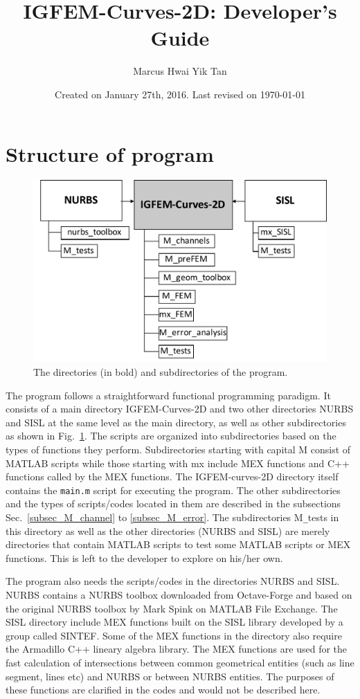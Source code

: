 \documentclass[11pt,letterpaper]{article}
\title{IGFEM-Curves-2D: Developer's Guide}
\author{Marcus Hwai Yik Tan}
\date{Created on January 27th, 2016. Last revised on \today}
\begin{document}
\maketitle
\section{Structure of program}
\begin{figure}[!h]
\centering
\includegraphics[width=\linewidth]{CodeStructure.pdf}
\caption{The directories (in bold) and subdirectories of the program. \label{fig_code_structure}}
\end{figure}
The program follows a straightforward functional programming paradigm. It consists of a main directory IGFEM-Curves-2D and two other directories NURBS and SISL at the same level as the main directory, as well as other subdirectories as shown in Fig.\ \ref{fig_code_structure}. The scripts are organized into subdirectories based on the types of functions they perform. Subdirectories starting with capital M  consist of MATLAB scripts while those starting with mx include MEX functions and C++ functions called by the MEX functions. The IGFEM-curves-2D directory itself contains the \texttt{main.m} script for executing the program. The other subdirectories and the types of scripts/codes located in them are described in the subsections Sec.\ \ref{subsec_M_channel} to \ref{subsec_M_error}. The subdirectories M\texttt{\_}tests in this directory as well as the other directories (NURBS and SISL) are merely directories that contain MATLAB scripts to test some MATLAB scripts or MEX functions. This is left to the developer to explore on his/her own. 

The program also needs the scripts/codes in the directories NURBS and SISL. NURBS contains a NURBS toolbox downloaded from Octave-Forge and based on the original NURBS toolbox by Mark Spink on MATLAB File Exchange. The SISL directory include MEX functions built on the SISL library developed by a group called SINTEF. Some of the MEX functions in the directory also require the Armadillo C++ lineary algebra library. The MEX functions are used for the fast calculation of intersections between common geometrical entities (such as line segment, lines etc) and NURBS or between NURBS entities. The purposes of these functions are clarified in the codes and would not be described here.  
\end{document}

